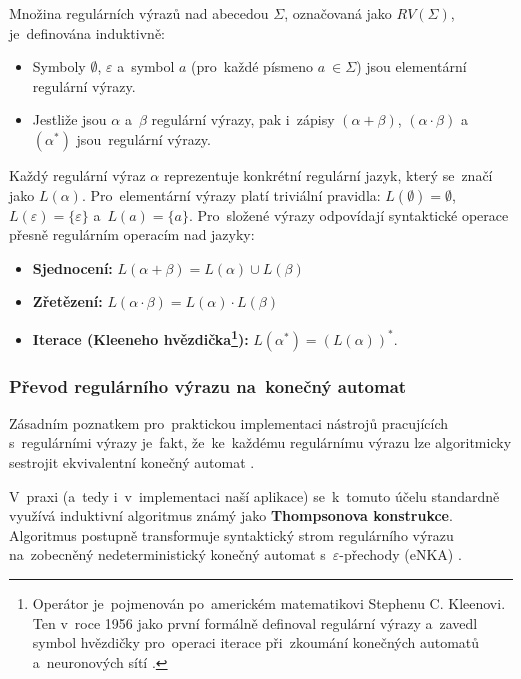 \documentclass[
  master,
  program=ainfvs,
  printversion,
  figures=false,
  tables=false,
  glossaries,
  index
]{kidiplom}
\begin{document}
\begin{definition}
Množina regulárních výrazů nad abecedou $\Sigma$, označovaná jako $RV(\Sigma)$, je~definována induktivně:
\begin{itemize}
    \item Symboly $\emptyset$, $\varepsilon$ a~symbol $a$ (pro~každé písmeno $a~\in \Sigma$) jsou elementární regulární výrazy.
    \item Jestliže jsou $\alpha$ a~$\beta$ regulární výrazy, pak i~zápisy $(\alpha + \beta)$, $(\alpha \cdot \beta)$ a~$(\alpha^*)$ jsou~regulární výrazy.
\end{itemize}
\end{definition}

Každý regulární výraz $\alpha$ reprezentuje konkrétní regulární jazyk, který se~značí jako $L(\alpha)$. Pro~elementární výrazy platí triviální pravidla: $L(\emptyset) = \emptyset$, $L(\varepsilon) = \{\varepsilon\}$ a~$L(a) = \{a\}$. Pro~složené výrazy odpovídají syntaktické operace přesně regulárním operacím nad jazyky:
\begin{itemize}
    \item \textbf{Sjednocení:} $L(\alpha + \beta) = L(\alpha) \cup L(\beta)$
    \item \textbf{Zřetězení:} $L(\alpha \cdot \beta) = L(\alpha) \cdot L(\beta)$
    \item \textbf{Iterace (Kleeneho hvězdička\footnote{Operátor je~pojmenován po~americkém matematikovi Stephenu C. Kleenovi. Ten v~roce 1956 jako první formálně definoval regulární výrazy a~zavedl symbol hvězdičky pro~operaci iterace při~zkoumání konečných automatů a~neuronových sítí \cite{kleene1956}.}):} $L(\alpha^*) = (L(\alpha))^*$.
\end{itemize}

\subsubsection{Převod regulárního výrazu na~konečný automat} \label{par:talg}
Zásadním poznatkem pro~praktickou implementaci nástrojů pracujících s~regulárními výrazy je~fakt, že~ke~každému regulárnímu výrazu lze algoritmicky sestrojit ekvivalentní konečný automat \cite[kapitola~3.12]{jancar_ti}. 

V~praxi (a~tedy i~v~implementaci naší aplikace) se~k~tomuto účelu standardně využívá induktivní algoritmus známý jako \textbf{Thompsonova konstrukce}. Algoritmus postupně transformuje syntaktický strom regulárního výrazu na~zobecněný nedeterministický konečný automat s~$\varepsilon$-přechody (\gls{eNKA}) \cite{mitra_thompson}. 
\end{document}
